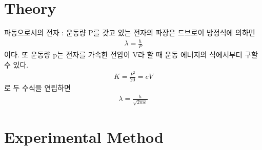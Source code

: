 \documentclass[a4paper, 10pt, nanum]{CSUniSchoolLabReport}
\begin{document}

\section{Theory}


	파동으로서의 전자 : 운동량 P를 갖고 있는 전자의 파장은 드브로이 방정식에 의하면
	\begin{align}
		\lambda = \frac{h}{P}
	\end{align}
	이다. 또 운동량 p는 전자를 가속한 전압이 V라 할 때 운동 에너지의 식에서부터 구할 수 있다.
	\begin{align}
		K = \frac{P^2}{20} = eV
	\end{align}
	로 두 수식을 연립하면
	\begin{align}
		\lambda = \frac{h}{\sqrt{2me}}
	\end{align}


\section{Experimental Method}
\end{document}
